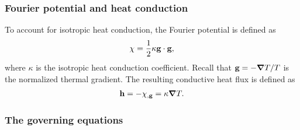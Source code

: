 \subsubsection{Fourier potential and heat conduction}

To account for isotropic heat conduction, the Fourier potential is defined as
\begin{align}
  \chi = \dfrac{1}{2}\kappa\textbf{g}\cdot\textbf{g}, \label{eq: chapter 5 fourier potential}
\end{align}
where $\kappa$ is the isotropic heat conduction coefficient. Recall that $\textbf{g} = - \boldsymbol{\nabla} T / T$ is the normalized thermal gradient. The resulting conductive heat flux is defined as
\begin{align}
  \textbf{h} = -\chi_{,\textbf{g}} = \kappa \boldsymbol{\nabla} T. \label{eq: conductive heat flux}
\end{align}

\subsubsection{The governing equations}


